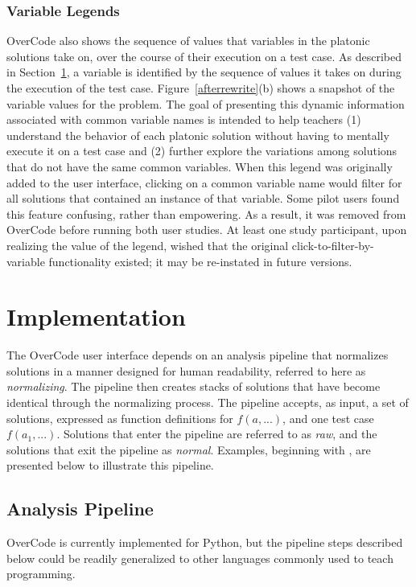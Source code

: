\subsubsection{Variable Legends} OverCode also shows the sequence of values that variables in the platonic solutions take on, over the course of their execution on a test case. As described in Section~\ref{pipeline}, a variable is identified by the sequence of values it takes on during the execution of the test case. Figure~\ref{afterrewrite}(b) shows a snapshot of the variable values for the  problem. The goal of presenting this dynamic information associated with common variable names is intended to help teachers (1) understand the behavior of each platonic solution without having to mentally execute it on a test case and (2) further explore the variations among solutions that do not have the same common variables. When this legend was originally added to the user interface, clicking on a common variable name would filter for all solutions that contained an instance of that variable. Some pilot users found this feature confusing, rather than empowering. As a result, it was removed from OverCode before running both user studies. At least one study participant, upon realizing the value of the legend, wished that the original click-to-filter-by-variable functionality existed; it may be re-instated in future versions.

\section{Implementation} \label{pipeline}
The OverCode user interface depends on an analysis pipeline that normalizes solutions in a manner designed for human readability, referred to here as \emph{normalizing}. The pipeline then creates stacks of solutions that have become identical through the normalizing process. The pipeline accepts, as input, a set of solutions, expressed as function definitions for $f(a,...)$, and one test case $f(a_{1},...)$. Solutions that enter the pipeline are referred to as \emph{raw}, and the solutions that exit the pipeline as \emph{normal}. Examples, beginning with , are presented below to illustrate this pipeline.

\subsection{Analysis Pipeline}
OverCode is currently implemented for Python, but the pipeline steps described below could be readily generalized to other languages commonly used to teach programming.

